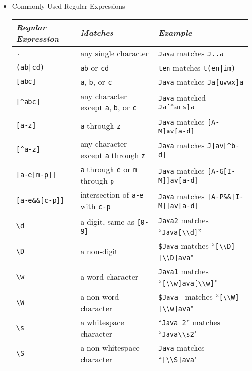 \begin{itemize}
	\item Commonly Used Regular Expressions\\
	\begin{tabular}{l l l}
		\hline
		\textit{Regular Expression} & \textit{Matches} & \textit{Example}\\
		\hline
		\hline
		\texttt{.} & any single character & \texttt{Java} matches \texttt{J..a}\\
		\texttt{(ab|cd)} & \texttt{ab} or \texttt{cd} & \texttt{ten} matches \texttt{t(en|im)}\\
		\texttt{[abc]} & \texttt{a}, \texttt{b}, or \texttt{c} & \texttt{Java} matches \texttt{Ja[uvwx]a}\\
		\texttt{[\string^abc]} & any character except \texttt{a}, \texttt{b}, or \texttt{c} & \texttt{Java} matched \texttt{Ja[\string^ars]a}\\
		\texttt{[a-z]} & \texttt{a} through \texttt{z} & \texttt{Java} matches \texttt{[A-M]av[a-d]}\\
		\texttt{[\string^a-z]} & any character except \texttt{a} through \texttt{z} & \texttt{Java} matches \texttt{J]av[\string^b-d]}\\
		\texttt{[a-e[m-p]]} & \texttt{a} through \texttt{e} or \texttt{m} through \texttt{p} & \texttt{Java} matches \texttt{[A-G[I-M]]av[a-d]}\\
		\texttt{[a-e\&\&[c-p]] }& intersection of \texttt{a-e} with \texttt{c-p} & \texttt{Java} matches \texttt{[A-P\&\&[I-M]]av[a-d]}\\
		\texttt{\textbackslash d} & a digit, same as \texttt{[0-9]} & \texttt{Java2} matches ``\texttt{Java[\textbackslash\textbackslash d]}'' \\
		\texttt{\textbackslash D} & a non-digit & \texttt{\$Java} matches ``\texttt{[\textbackslash\textbackslash D][\textbackslash\textbackslash D]ava}"\\
		\texttt{\textbackslash w} & a word character & \texttt{Java1} matches ``\texttt{[\textbackslash\textbackslash w]ava[\textbackslash\textbackslash w]}"\\
		\texttt{\textbackslash W} & a non-word character & \texttt{\$Java } matches ``\texttt{[\textbackslash\textbackslash W][\textbackslash\textbackslash w]ava}"\\
		\texttt{\textbackslash s} & a whitespace character & ``\texttt{Java 2}'' matches ``\texttt{Java\textbackslash\textbackslash s2}"\\
		\texttt{\textbackslash S} & a non-whitespace character & \texttt{Java} matches ``\texttt{[\textbackslash\textbackslash S]ava}"\\

\end{tabular}
\end{itemize}
